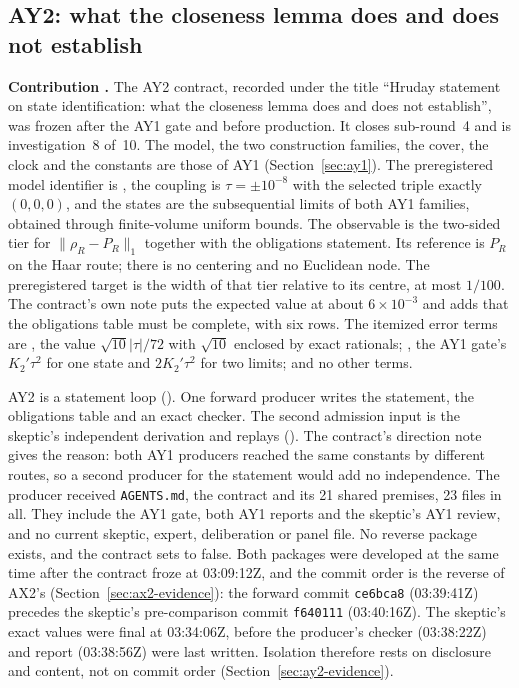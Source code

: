 \subsection{AY2: what the closeness lemma does and does not establish}
\label{sec:ay2}

\textbf{Contribution .} The AY2 contract, recorded under
the title ``Hruday statement on state identification: what the closeness lemma
does and does not establish'', was frozen after the AY1 gate and before
production. It closes sub-round~4 and is investigation~8 of~10. The model, the
two construction families, the cover, the clock and the constants are those of
AY1 (Section~\ref{sec:ay1}). The preregistered model identifier is
, the coupling is $\tau=\pm10^{-8}$ with the
selected triple exactly $(0,0,0)$, and the states are the subsequential limits
of both AY1 families, obtained through finite-volume uniform bounds. The
observable is the two-sided tier for $\lVert \rho_R-P_R\rVert_1$ together with the
obligations statement. Its reference is $P_R$ on the Haar route; there is no
centering and no Euclidean node. The preregistered target is the width of that
tier relative to its centre, at most $1/100$. The contract's own note puts the
expected value at about $6\times10^{-3}$ and adds that the obligations table
must be complete, with six rows. The itemized error terms are
, the value $\sqrt{10}|\tau|/72$ with $\sqrt{10}$
enclosed by exact rationals; , the AY1 gate's
$K_2'\tau^2$ for one state and $2K_2'\tau^2$ for two limits; and no other
terms.

AY2 is a statement loop (). One forward producer
writes the statement, the obligations table and an exact checker. The second
admission input is the skeptic's independent derivation and replays
(). The contract's direction note
gives the reason: both AY1 producers reached the same constants by different
routes, so a second producer for the statement would add no independence. The
producer received \texttt{AGENTS.md}, the contract and its 21 shared premises,
23 files in all. They include the AY1 gate, both AY1 reports and the skeptic's
AY1 review, and no current skeptic, expert, deliberation or panel file. No
reverse package exists, and the contract sets
 to false. Both packages were developed at the
same time after the contract froze at 03:09:12Z, and the commit order is the
reverse of AX2's (Section~\ref{sec:ax2-evidence}): the forward commit
\texttt{ce6bca8} (03:39:41Z) precedes the skeptic's pre-comparison commit
\texttt{f640111} (03:40:16Z). The skeptic's exact values were final at
03:34:06Z, before the producer's checker (03:38:22Z) and report (03:38:56Z)
were last written. Isolation therefore rests on disclosure and content, not on
commit order (Section~\ref{sec:ay2-evidence}).

